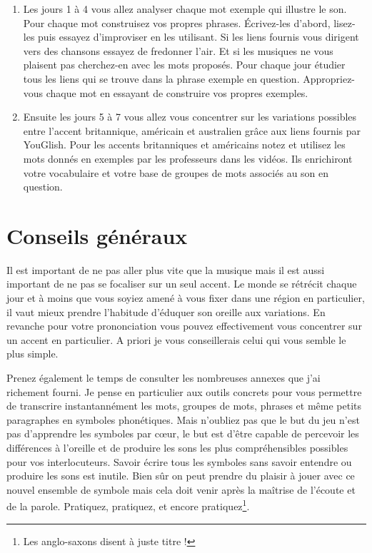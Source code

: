 \begin{enumerate}
\item Les jours 1 à 4 vous allez analyser chaque mot exemple qui
  illustre le son. Pour chaque mot construisez vos propres
  phrases. \'Ecrivez-les d'abord, lisez-les puis essayez d'improviser
  en les utilisant. Si les liens fournis vous dirigent vers des
  chansons essayez de fredonner l'air. Et si les musiques ne vous
  plaisent pas cherchez-en avec les mots proposés. Pour chaque jour
  étudier tous les liens qui se trouve dans la phrase exemple en
  question. Appropriez-vous chaque mot en essayant de construire vos
  propres exemples.
\item  Ensuite les jours 5 à 7 vous allez vous concentrer sur les variations
 possibles entre l'accent britannique, américain et australien grâce
 aux liens fournis par YouGlish. Pour les accents britanniques et
 américains notez et utilisez les mots donnés en exemples par les
 professeurs dans les vidéos. Ils enrichiront votre vocabulaire et
 votre base de groupes de mots associés au son en question.
\end{enumerate}

\section{Conseils généraux}\label{sec:gen}

Il est important de ne pas aller plus vite que la musique mais il est
aussi important de ne pas se focaliser sur un seul accent. Le monde
se rétrécit chaque jour et à moins que vous soyiez amené à vous fixer
dans une région en particulier, il vaut mieux prendre l'habitude
d'éduquer son oreille aux variations. En revanche pour votre
prononciation vous pouvez effectivement vous concentrer sur un accent
en particulier. A priori je vous conseillerais celui qui vous semble
le plus simple.  

Prenez également le temps de consulter les nombreuses annexes que j'ai
richement fourni. Je pense en particulier aux outils concrets pour
vous permettre de transcrire instantannément les mots, groupes de
mots, phrases et même petits paragraphes en symboles phonétiques. Mais
n'oubliez pas que le but du jeu n'est pas d'apprendre les symboles par
c{\oe}ur, le but est d'être capable de percevoir les différences à
l'oreille et de produire les sons les plus compréhensibles possibles
pour vos interlocuteurs. Savoir écrire tous les symboles sans savoir
entendre ou produire les sons est inutile. Bien sûr on peut prendre du
plaisir à jouer avec ce nouvel ensemble de symbole mais cela doit
venir après la maîtrise de l'écoute et de la parole. Pratiquez,
pratiquez, et encore pratiquez\footnote{Les anglo-saxons disent
   à juste titre !}. 

